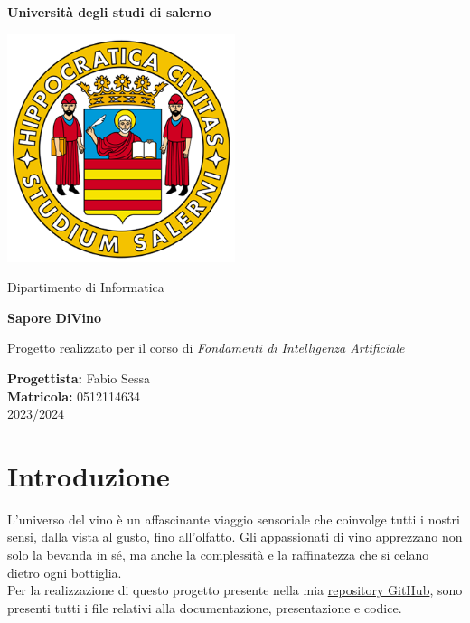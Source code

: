 \documentclass{article}
\begin{document}
\begin{titlepage}
    \begin{center}

        \textbf{\LARGE Università degli studi di salerno}

        \vspace{0.5cm}
        
        \includegraphics[width=0.5\textwidth]{unisa.png} 
        
        \vspace{0.3cm}
                
        \large Dipartimento di Informatica
        
        \vspace{3cm}
        
        \Huge \textbf{Sapore DiVino}
        
        \vspace{0.2cm}
        
        \large Progetto realizzato per il corso di \textit {Fondamenti di Intelligenza Artificiale}
        
        \vspace{3.0cm}
        
        \large \textbf{Progettista:} Fabio Sessa \\
        \large \textbf{Matricola:} 0512114634 \\
        \vspace{1.6cm}
        2023/2024
        
        \vspace{2cm}
    \end{center}
        \newpage
        \tableofcontents

        \newpage
        \section{Introduzione}
            L'universo del vino è un affascinante viaggio sensoriale che coinvolge tutti i nostri sensi, dalla vista al gusto, fino all'olfatto. Gli appassionati di vino apprezzano non solo la bevanda in sé, ma anche la complessità e la raffinatezza che si celano dietro ogni bottiglia. \\
            Per la realizzazione di questo progetto presente nella mia \href{https://github.com/bafiuss/SaporeDiVino.git}{repository GitHub}, sono presenti tutti i file relativi alla documentazione, presentazione e codice. 


\end{titlepage}
\end{document}
